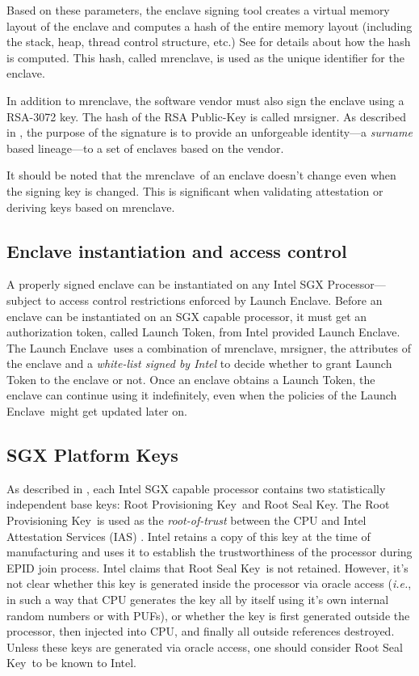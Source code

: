 \documentclass[letterpaper]{article}
\newcommand{\ie}{\textit{i.e.}}
\newcommand{\mrenclave}{\textsf{mrenclave}}
\newcommand{\mrsigner}{\textsf{mrsigner}}
\newcommand{\launchenclave}{\textsf{Launch Enclave}}
\newcommand{\rpk}{\textsf{Root Provisioning Key}}
\newcommand{\rsk}{\textsf{Root Seal Key}}
\begin{document}
  Based on these parameters, the enclave signing tool creates a
  virtual memory layout of the enclave and computes a hash of the
  entire memory layout (including the stack, heap, thread control
  structure, etc.)  See \cite{intelsdm} for details about how the hash
  is computed. This hash, called \mrenclave, is used as the unique
  identifier for the enclave.

  In addition to \mrenclave, the software vendor must also sign the
  enclave using a RSA-3072 key. The hash of the RSA Public-Key is
  called \mrsigner. As described in \cite{surnaming}, the purpose of
  the signature is to provide an unforgeable identity---a
  \textit{surname} based lineage---to a set of enclaves based on the
  vendor.

  It should be noted that the \mrenclave\ of an enclave doesn't change
  even when the signing key is changed. This is significant when
  validating attestation or deriving keys based on \mrenclave.

  \subsection{Enclave instantiation and access control}

  A properly signed enclave can be instantiated on any Intel SGX
  Processor---subject to access control restrictions enforced by
  \launchenclave. Before an enclave can be instantiated on an SGX
  capable processor, it must get an authorization token, called
  \textsf{Launch Token}, from Intel provided \launchenclave. The
  \launchenclave\ uses a combination of \mrenclave, \mrsigner, the
  attributes of the enclave and a \textit{white-list signed by Intel}
  to decide whether to grant \textsf{Launch Token} to the enclave or
  not. Once an enclave obtains a \textsf{Launch Token}, the enclave
  can continue using it indefinitely, even when the policies of the
  \launchenclave\ might get updated later on.

  \subsection{SGX Platform Keys}
  \label{ssec:platkeys}

  As described in \cite{sgxattest}, each Intel SGX capable processor
  contains two statistically independent base keys: \rpk\ and \rsk.
  The \rpk\ is used as the \textit{root-of-trust} between the CPU and
  Intel Attestation Services (IAS) \cite{ias}. Intel retains a copy of
  this key at the time of manufacturing and uses it to establish the
  trustworthiness of the processor during EPID join process. Intel
  claims that \rsk\ is not retained. However, it's not clear whether
  this key is generated inside the processor via oracle access (\ie,
  in such a way that CPU generates the key all by itself using it's
  own internal random numbers or with PUFs), or whether the key is
  first generated outside the processor, then injected into CPU, and
  finally all outside references destroyed. Unless these keys are
  generated via oracle access, one should consider \rsk\ to be known
  to Intel.
\end{document}
